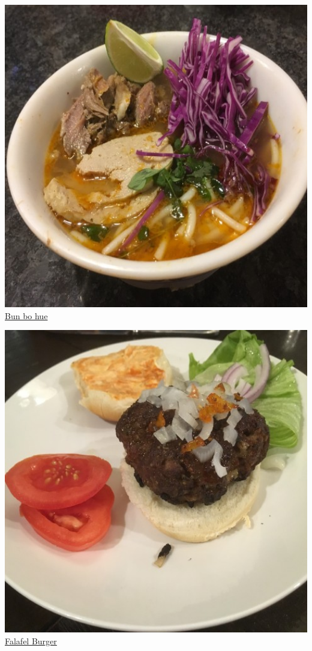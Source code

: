 \documentclass[
]{book}
\begin{document}
\protect\hyperlink{bohue}{\includegraphics[width=1\textwidth,height=\textheight]{bun_bo_hue_small.jpg}}
\protect\hyperlink{bohue}{Bun bo hue}

\protect\hyperlink{burger}{\includegraphics[width=1\textwidth,height=\textheight]{falafel_burger_small.jpg}}
\protect\hyperlink{burger}{Falafel Burger}
\end{document}
